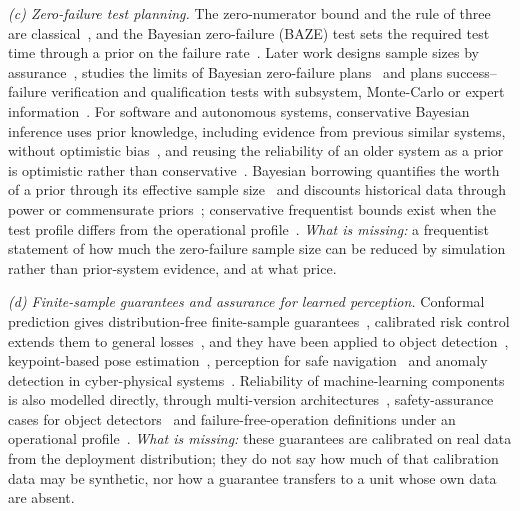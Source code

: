 \emph{(c) Zero-failure test planning.} The zero-numerator bound and the rule of three are
classical~\cite{hanley1983,meeker2017}, and the Bayesian zero-failure (BAZE) test sets the required test time through a
prior on the failure rate~\cite{baze1979}. Later work designs sample sizes by assurance~\cite{wilson2021assurance},
studies the limits of Bayesian zero-failure plans~\cite{yoon2025bayesian} and plans success--failure verification and
qualification tests with subsystem, Monte-Carlo or expert information~\cite{ding2024truncated,wang2024monoprop,tan2025weibull}.
For software and autonomous systems, conservative Bayesian inference uses prior knowledge, including evidence from
previous similar systems, without optimistic bias~\cite{zhao2018perfection,zhao2019cbi,zhao2020operational}, and reusing
the reliability of an older system as a prior is optimistic rather than conservative~\cite{littlewood2020replacement}.
Bayesian borrowing quantifies the worth of a prior through its effective sample size~\cite{morita2008ess} and discounts
historical data through power or commensurate priors~\cite{ibrahim2000power,hobbs2011commensurate}; conservative
frequentist bounds exist when the test profile differs from the operational profile~\cite{bishop2017profiles}.
\emph{What is missing:} a frequentist statement of how much the zero-failure sample size can be reduced by simulation
rather than prior-system evidence, and at what price.

\emph{(d) Finite-sample guarantees and assurance for learned perception.} Conformal prediction gives distribution-free
finite-sample guarantees~\cite{angelopoulos2023gentle}, calibrated risk control extends them to general
losses~\cite{angelopoulos2025ltt}, and they have been applied to object detection~\cite{degrancey2022conformaldet},
keypoint-based pose estimation~\cite{yang2023purse}, perception for safe navigation~\cite{mei2025pwc} and anomaly detection
in cyber-physical systems~\cite{yuan2026conformal}. Reliability of machine-learning components is also modelled directly,
through multi-version architectures~\cite{wen2025nversion}, safety-assurance cases for object
detectors~\cite{paterson2025amlas} and failure-free-operation definitions under an operational
profile~\cite{aghazadeh2026hipllm}. \emph{What is missing:} these guarantees are calibrated on real data from the
deployment distribution; they do not say how much of that calibration data may be synthetic, nor how a guarantee
transfers to a unit whose own data are absent.
